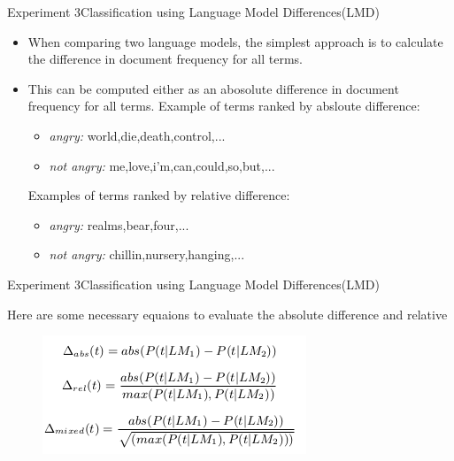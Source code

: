 \documentclass{beamer}
\begin{document}
\begin{frame}{Experiment 3}{Classification using Language Model Differences(LMD)}
  \begin{itemize}
  \item {
    When  comparing two language models, the simplest approach is to calculate the difference in document frequency for all terms.  
  }
  \item 
  {
  	This can be computed either as an abosolute difference in document frequency for all terms.
Example of terms ranked by absloute difference:


	\begin{itemize}
	\item
	{
		\textit{angry:} world,die,death,control,...
	}
	\item
	{
		\textit{not angry:} me,love,i'm,can,could,so,but,...
	}
	\end{itemize}
	Examples of terms ranked by relative difference:
	\begin{itemize}
	\item
	{
		\textit{angry:} realms,bear,four,...
	}
	\item
	{
		\textit{not angry:} chillin,nursery,hanging,...
	}
	\end{itemize}
  }
  
  
  \end{itemize}
\end{frame}

\begin{frame}{Experiment 3}{Classification using Language Model Differences(LMD)}

Here are some necessary equaions to evaluate the absolute difference and relative
\begin{figure}
\centering
\includegraphics{eq}
\end{figure}

\end{frame}
\end{document}
